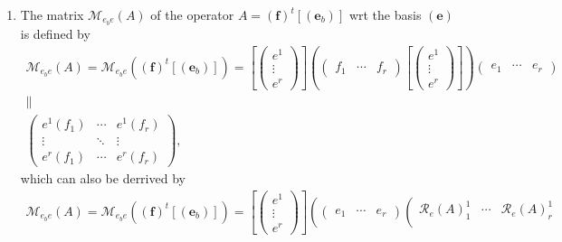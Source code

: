 \documentclass[aps,preprint]{revtex4}
\begin{document}
\begin{enumerate}
\begin{enumerate}
\item The matrix $\mathcal{M}_{e_{b}e}\left( A\right) $ of the operator $%
A=\left( \boldsymbol{f}\right) ^{t}\left[ \left( \boldsymbol{e}_{b}\right) %
\right] $ wrt the basis $\left( \boldsymbol{e}\right) $ is defined by 
\begin{gather}
\mathcal{M}_{e_{b}e}\left( A\right) =\mathcal{M}_{e_{b}e}\left( \left( 
\boldsymbol{f}\right) ^{t}\left[ \left( \boldsymbol{e}_{b}\right) \right]
\right) =\left[ \left( 
\begin{array}{c}
e^{1} \\ 
\vdots \\ 
e^{r}%
\end{array}%
\right) \right] \left( \left( 
\begin{array}{ccc}
f_{1} & \cdots & f_{r}%
\end{array}%
\right) \left[ \left( 
\begin{array}{c}
e^{1} \\ 
\vdots \\ 
e^{r}%
\end{array}%
\right) \right] \right) \left( 
\begin{array}{ccc}
e_{1} & \cdots & e_{r}%
\end{array}%
\right) \\
\parallel \\
\left( 
\begin{array}{ccc}
e^{1}\left( f_{1}\right) & \cdots & e^{1}\left( f_{r}\right) \\ 
\vdots & \ddots & \vdots \\ 
e^{r}\left( f_{1}\right) & \cdots & e^{r}\left( f_{r}\right)%
\end{array}%
\right) ,
\end{gather}%
which can also be derrived by 
\begin{gather}
\mathcal{M}_{e_{b}e}\left( A\right) =\mathcal{M}_{e_{b}e}\left( \left( 
\boldsymbol{f}\right) ^{t}\left[ \left( \boldsymbol{e}_{b}\right) \right]
\right) =\left[ \left( 
\begin{array}{c}
e^{1} \\ 
\vdots \\ 
e^{r}%
\end{array}%
\right) \right] \left( \left( 
\begin{array}{ccc}
e_{1} & \cdots & e_{r}%
\end{array}%
\right) \left( 
\begin{array}{ccc}
\mathcal{R}_{e}\left( A\right) _{1}^{1} & \cdots & \mathcal{R}_{e}\left(
A\right) _{r}^{1} \\ 

\end{array}
\end{gather}
\end{enumerate}
\end{enumerate}
\end{document}

